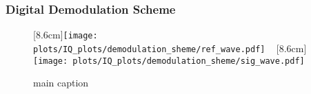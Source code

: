 \subsubsection{Digital Demodulation Scheme}



\begin{figure}
\centering
{}
[8.6cm]{\texttt{[image: plots/IQ\_plots/demodulation\_sheme/ref\_wave.pdf]}}
~
[8.6cm]{\texttt{[image: plots/IQ\_plots/demodulation\_sheme/sig\_wave.pdf]}}
\caption{main caption}
\label{fig:jpc:noise_rise:main}
\end{figure}

